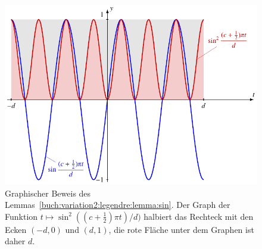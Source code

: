%
%
%
\begin{figure}
\centering
\includegraphics{chapters/060-variation2/images/sin2.pdf}
\caption{Graphischer Beweis des Lemmas~\ref{buch:variation2:legendre:lemma:sin}.
Der Graph der Funktion $t\mapsto\sin^2((c+\frac12)\pi t)/d)$
halbiert das Rechteck mit den Ecken $(-d,0)$ und $(d,1)$,
die rote Fläche unter dem Graphen ist daher $d$.
\label{buch:variation2:legendre:fig:sin2}}
\end{figure}

